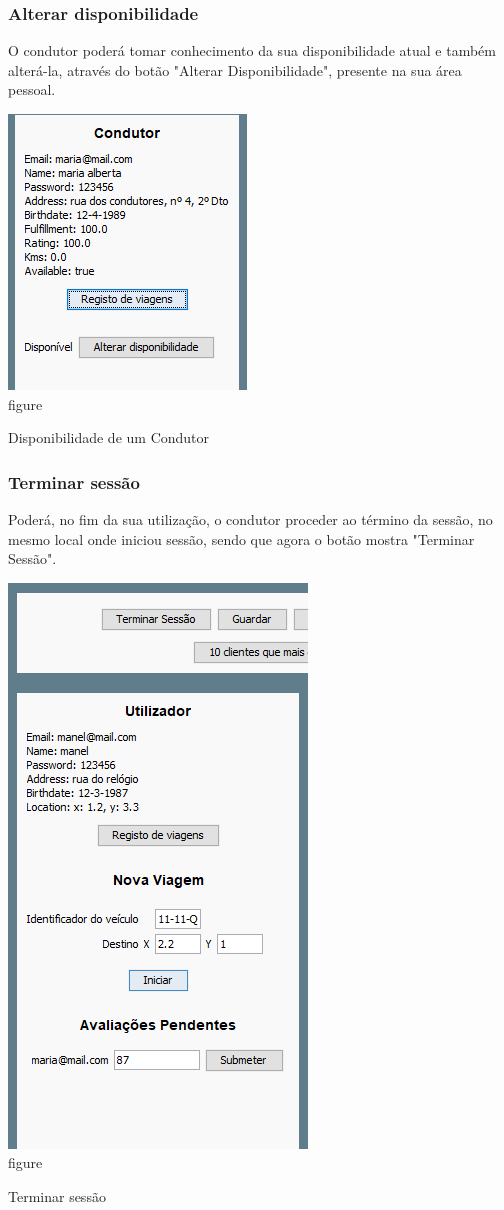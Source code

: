 \documentclass[a4paper]{article}
\begin{document}
\subsubsection{Alterar disponibilidade}
O condutor poderá tomar conhecimento da sua disponibilidade atual e também alterá-la, através do botão "Alterar Disponibilidade", presente na sua área pessoal.
\begin{center}
  \includegraphics[scale=0.75]{condutor_disponibilidade}\\
  \caption{figure}{Disponibilidade de um Condutor}
  \label{fig:picture}
\end{center}
\subsubsection{Terminar sessão}
Poderá, no fim da sua utilização, o condutor proceder ao término da sessão, no mesmo local onde iniciou sessão, sendo que agora o botão mostra "Terminar Sessão".
\begin{center}
  \includegraphics[scale=0.75]{terminarsessao}\\
  \caption{figure}{Terminar sessão}
  \label{fig:picture}
\end{center}
\end{document}
